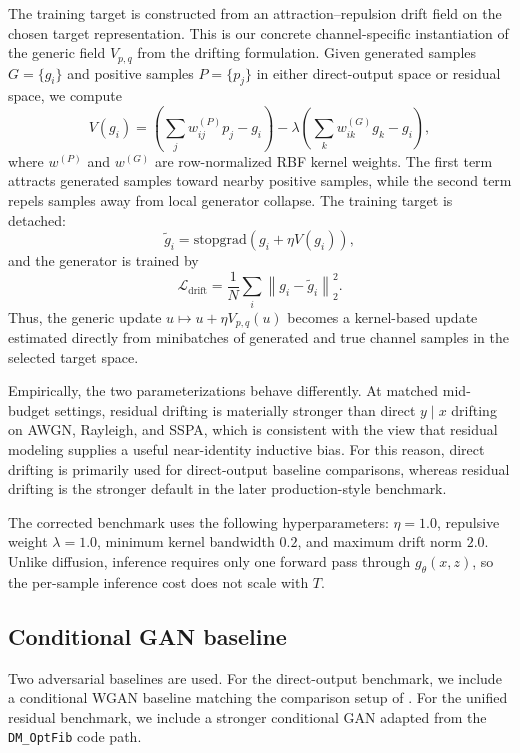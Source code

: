 The training target is constructed from an attraction--repulsion drift field on the chosen target representation.
This is our concrete channel-specific instantiation of the generic field \(V_{p,q}\) from the drifting formulation.
Given generated samples \(G = \{g_i\}\) and positive samples \(P = \{p_j\}\) in either direct-output space or residual space, we compute
\begin{equation}
V(g_i)
=
\left(
\sum_j w^{(P)}_{ij} p_j - g_i
\right)
-
\lambda
\left(
\sum_k w^{(G)}_{ik} g_k - g_i
\right),
\end{equation}
where \(w^{(P)}\) and \(w^{(G)}\) are row-normalized RBF kernel weights.
The first term attracts generated samples toward nearby positive samples, while the second term repels samples away from local generator collapse.
The training target is detached:
\begin{equation}
\tilde{g}_i
=
\mathrm{stopgrad}\!\left(g_i + \eta V(g_i)\right),
\end{equation}
and the generator is trained by
\begin{equation}
\mathcal{L}_{\text{drift}}
=
\frac{1}{N}
\sum_i
\left\|
g_i - \tilde{g}_i
\right\|_2^2.
\end{equation}
Thus, the generic update \(u \mapsto u + \eta V_{p,q}(u)\) becomes a kernel-based update estimated directly from minibatches of generated and true channel samples in the selected target space.

Empirically, the two parameterizations behave differently.
At matched mid-budget settings, residual drifting is materially stronger than direct \(y \mid x\) drifting on AWGN, Rayleigh, and SSPA, which is consistent with the view that residual modeling supplies a useful near-identity inductive bias.
For this reason, direct drifting is primarily used for direct-output baseline comparisons, whereas residual drifting is the stronger default in the later production-style benchmark.

The corrected benchmark uses the following hyperparameters:
\(\eta = 1.0\),
repulsive weight \(\lambda = 1.0\),
minimum kernel bandwidth \(0.2\),
and maximum drift norm \(2.0\).
Unlike diffusion, inference requires only one forward pass through \(g_\theta(x, z)\), so the per-sample inference cost does not scale with \(T\).

\subsection{Conditional GAN baseline}
Two adversarial baselines are used.
For the direct-output benchmark, we include a conditional WGAN baseline matching the comparison setup of \cite{paper2309}.
For the unified residual benchmark, we include a stronger conditional GAN adapted from the \texttt{DM\_OptFib} code path.

